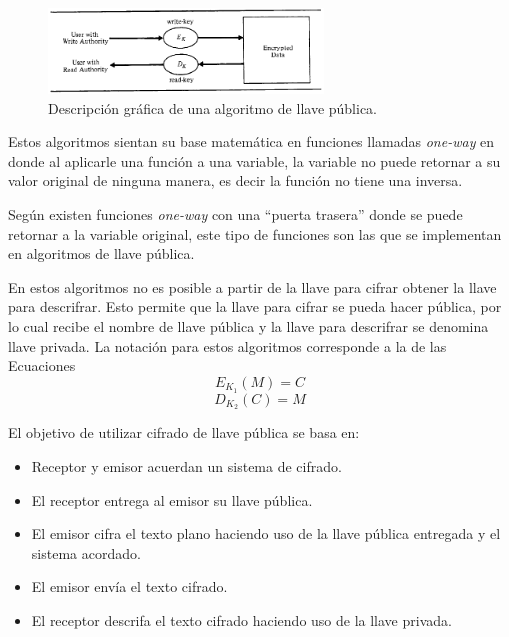 \begin{figure}
	\centering
	\includegraphics[width=0.65\textwidth]{./images/figPublicKeyAlgorithm}
	\caption{Descripción gráfica de una algoritmo de llave pública.}
	\label{figPublicKeyAlgorithm}
\end{figure}

Estos algoritmos sientan su base matemática en funciones llamadas \textit{one-way} en donde al aplicarle una función a una variable, la variable no puede retornar a su valor original de ninguna manera, es decir la función no tiene una inversa. 

Según \cite{bruce} existen funciones \textit{one-way} con una ``puerta trasera'' donde se puede retornar a la variable original, este tipo de funciones son las que se implementan en algoritmos de llave pública.

En estos algoritmos no es posible a partir de la llave para cifrar obtener la llave para descrifrar. Esto permite que la llave para cifrar se pueda hacer pública, por lo cual recibe el nombre de llave pública y la llave para descrifrar se denomina llave privada. La notación para estos algoritmos corresponde a la de las Ecuaciones \
\begin{equation} \label{eqCifradoPublico}
E_K_1 (M) = C
\end{equation}
\begin{equation} \label{eqDescfiradoPublico}
D_K_2 (C) = M
\end{equation}

El objetivo de utilizar cifrado de llave pública se basa en:
\begin{itemize}
\item Receptor y emisor acuerdan un sistema de cifrado.
\item El receptor entrega al emisor su llave pública.
\item El emisor cifra el texto plano haciendo uso de la llave pública entregada y el sistema acordado.
\item El emisor envía el texto cifrado.
\item El receptor descrifa el texto cifrado haciendo uso de la llave privada.
\end{itemize}


